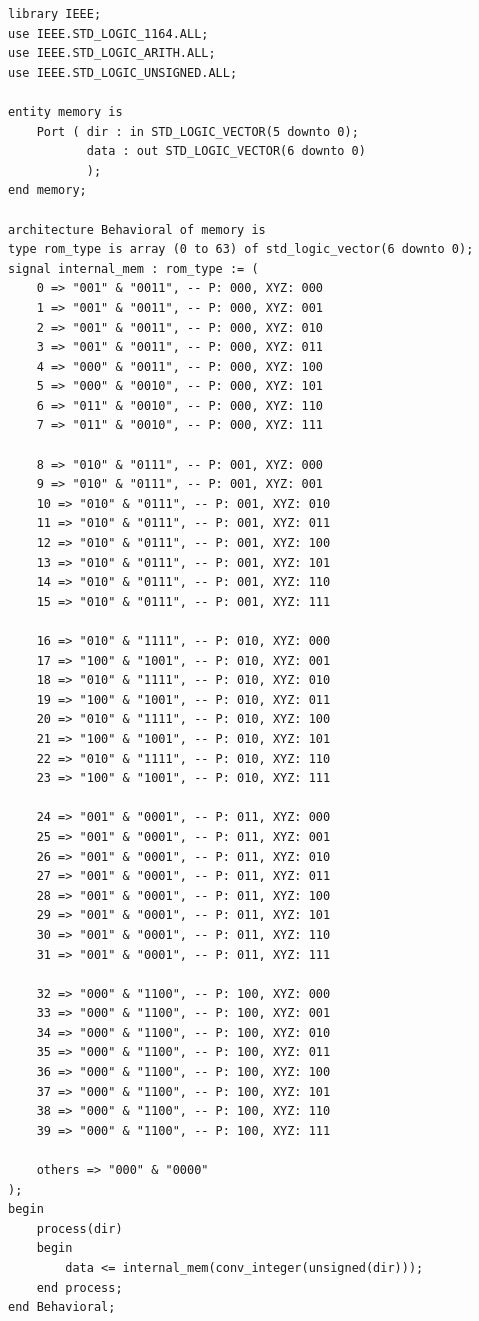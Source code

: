 \documentclass[12pt, letterpaper]{article}
\begin{document}
\begin{lstlisting}[style=vhdl, caption={Código completo de la memoria ROM.}, label={lst:memory_rom}]
library IEEE;
use IEEE.STD_LOGIC_1164.ALL;
use IEEE.STD_LOGIC_ARITH.ALL;
use IEEE.STD_LOGIC_UNSIGNED.ALL;

entity memory is
    Port ( dir : in STD_LOGIC_VECTOR(5 downto 0);
           data : out STD_LOGIC_VECTOR(6 downto 0)
           );
end memory;

architecture Behavioral of memory is
type rom_type is array (0 to 63) of std_logic_vector(6 downto 0);
signal internal_mem : rom_type := (
    0 => "001" & "0011", -- P: 000, XYZ: 000
    1 => "001" & "0011", -- P: 000, XYZ: 001
    2 => "001" & "0011", -- P: 000, XYZ: 010
    3 => "001" & "0011", -- P: 000, XYZ: 011
    4 => "000" & "0011", -- P: 000, XYZ: 100
    5 => "000" & "0010", -- P: 000, XYZ: 101
    6 => "011" & "0010", -- P: 000, XYZ: 110
    7 => "011" & "0010", -- P: 000, XYZ: 111

    8 => "010" & "0111", -- P: 001, XYZ: 000
    9 => "010" & "0111", -- P: 001, XYZ: 001
    10 => "010" & "0111", -- P: 001, XYZ: 010
    11 => "010" & "0111", -- P: 001, XYZ: 011
    12 => "010" & "0111", -- P: 001, XYZ: 100
    13 => "010" & "0111", -- P: 001, XYZ: 101
    14 => "010" & "0111", -- P: 001, XYZ: 110
    15 => "010" & "0111", -- P: 001, XYZ: 111

    16 => "010" & "1111", -- P: 010, XYZ: 000
    17 => "100" & "1001", -- P: 010, XYZ: 001
    18 => "010" & "1111", -- P: 010, XYZ: 010
    19 => "100" & "1001", -- P: 010, XYZ: 011
    20 => "010" & "1111", -- P: 010, XYZ: 100
    21 => "100" & "1001", -- P: 010, XYZ: 101
    22 => "010" & "1111", -- P: 010, XYZ: 110
    23 => "100" & "1001", -- P: 010, XYZ: 111

    24 => "001" & "0001", -- P: 011, XYZ: 000
    25 => "001" & "0001", -- P: 011, XYZ: 001
    26 => "001" & "0001", -- P: 011, XYZ: 010
    27 => "001" & "0001", -- P: 011, XYZ: 011
    28 => "001" & "0001", -- P: 011, XYZ: 100
    29 => "001" & "0001", -- P: 011, XYZ: 101
    30 => "001" & "0001", -- P: 011, XYZ: 110
    31 => "001" & "0001", -- P: 011, XYZ: 111

    32 => "000" & "1100", -- P: 100, XYZ: 000
    33 => "000" & "1100", -- P: 100, XYZ: 001
    34 => "000" & "1100", -- P: 100, XYZ: 010
    35 => "000" & "1100", -- P: 100, XYZ: 011
    36 => "000" & "1100", -- P: 100, XYZ: 100
    37 => "000" & "1100", -- P: 100, XYZ: 101
    38 => "000" & "1100", -- P: 100, XYZ: 110
    39 => "000" & "1100", -- P: 100, XYZ: 111

    others => "000" & "0000"
);
begin
    process(dir)
    begin
        data <= internal_mem(conv_integer(unsigned(dir)));
    end process;
end Behavioral;
\end{lstlisting}
\end{document}
